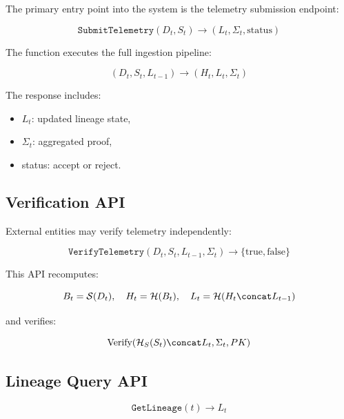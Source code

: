 The primary entry point into the system is the telemetry submission endpoint:

\begin{equation}
\texttt{SubmitTelemetry}(D_t, S_t) \rightarrow (L_t, \Sigma_t, \text{status})
\end{equation}

The function executes the full ingestion pipeline:

\begin{equation}
(D_t, S_t, L_{t-1}) \rightarrow (H_t, L_t, \Sigma_t)
\end{equation}

The response includes:
\begin{itemize}
\item $L_t$: updated lineage state,
\item $\Sigma_t$: aggregated proof,
\item status: accept or reject.
\end{itemize}

\subsection{Verification API}

External entities may verify telemetry independently:

\begin{equation}
\texttt{VerifyTelemetry}(D_t, S_t, L_{t-1}, \Sigma_t) \rightarrow \{\text{true}, \text{false}\}
\end{equation}

This API recomputes:

\begin{equation}
B_t = \mathcal{S}(D_t), \quad H_t = \mathcal{H}(B_t), \quad L_t = \mathcal{H}(H_t \concat L_{t-1})
\end{equation}

and verifies:

\begin{equation}
\text{Verify}(\mathcal{H}_S(S_t) \concat L_t, \Sigma_t, PK)
\end{equation}

\subsection{Lineage Query API}

\begin{equation}
\texttt{GetLineage}(t) \rightarrow L_t
\end{equation}

